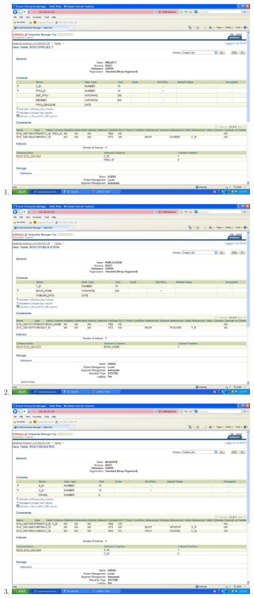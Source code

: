 \documentclass{article}
\begin{document}
\begin{enumerate}
	\item
		\includegraphics[scale=0.4]{figs/6.JPG}
	\item
		\includegraphics[scale=0.4]{figs/7.JPG}
	\item
		\includegraphics[scale=0.4]{figs/8.JPG}

\end{enumerate}
\end{document}
